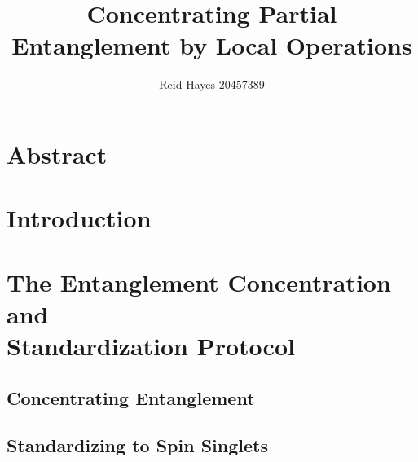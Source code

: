 \documentclass[12pt,letterpaper]{article}
\author{Reid Hayes 20457389}
\title{Concentrating Partial Entanglement by Local Operations}
\begin{document}
\maketitle
\section{Abstract}
\section{Introduction}


\section{The Entanglement Concentration and \\Standardization Protocol}
\subsection{Concentrating Entanglement}
\label{sec:concentrating}


\subsection{Standardizing to Spin Singlets}
\label{sec:standardizing}

\printbibliography
\end{document}
